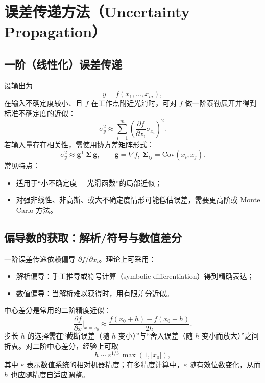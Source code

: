 \documentclass[UTF8,a4paper,11pt]{ctexart}
\begin{document}
\section{误差传递方法（Uncertainty Propagation）}

\subsection{一阶（线性化）误差传递}

设输出为
\begin{equation}
y=f(x_1,\ldots,x_m),
\end{equation}
在输入不确定度较小、且 $f$ 在工作点附近光滑时，可对 $f$ 做一阶泰勒展开并得到标准不确定度的近似：
\begin{equation}
\sigma_y^2 \approx \sum_{i=1}^{m}\left(\frac{\partial f}{\partial x_i}\sigma_{x_i}\right)^2.
\end{equation}
若输入量存在相关性，需使用协方差矩阵形式：
\begin{equation}
\sigma_y^2 \approx \bm{g}^\mathsf{T}\,\bm{\Sigma}\,\bm{g},\qquad
\bm{g}=\nabla f,\ \bm{\Sigma}_{ij}=\mathrm{Cov}(x_i,x_j).
\end{equation}
常见特点：
\begin{itemize}
  \item 适用于“小不确定度 + 光滑函数”的局部近似；
  \item 对强非线性、非高斯、或大不确定度情形可能低估误差，需要更高阶或 Monte Carlo 方法。
\end{itemize}

\subsection{偏导数的获取：解析/符号与数值差分}

一阶误差传递依赖偏导 $\partial f/\partial x_i$。理论上可采用：
\begin{itemize}
  \item 解析偏导：手工推导或符号计算（symbolic differentiation）得到精确表达；
  \item 数值偏导：当解析难以获得时，用有限差分近似。
\end{itemize}

中心差分是常用的二阶精度近似：
\begin{equation}
\frac{\partial f}{\partial x}\bigg|_{x=x_0}\approx \frac{f(x_0+h)-f(x_0-h)}{2h}.
\end{equation}
步长 $h$ 的选择需在“截断误差（随 $h$ 变小）”与“舍入误差（随 $h$ 变小而放大）”之间折衷。对二阶中心差分，经验上可取
\begin{equation}
h \sim \varepsilon^{1/3}\,\max(1,|x_0|),
\end{equation}
其中 $\varepsilon$ 表示数值系统的相对机器精度；在多精度计算中，$\varepsilon$ 随有效位数变化，从而 $h$ 也应随精度自适应调整。
\end{document}

